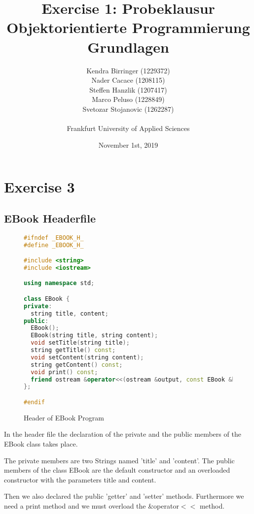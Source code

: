 \documentclass[a4paper, 10pt]{article}
\title{Exercise 1: Probeklausur Objektorientierte Programmierung Grundlagen}
\author{
    Kendra Birringer (1229372)\\
    Nader Cacace (1208115)\\
    Steffen Hanzlik (1207417)\\
    Marco Peluso (1228849)\\
    Svetozar Stojanovic (1262287)\\
    \\
    Frankfurt University of Applied Sciences
}
\date{November 1st, 2019}
\begin{document}
\maketitle

\newpage
\tableofcontents
\listoffigures

\newpage
\section{Exercise 3}
\subsection{EBook Headerfile}
\begin{figure}[ht]
\begin{lstlisting}[language=c++]
#ifndef _EBOOK_H_
#define _EBOOK_H_

#include <string>
#include <iostream>

using namespace std;

class EBook {
private:
  string title, content;
public:
  EBook();
  EBook(string title, string content);
  void setTitle(string title);
  string getTitle() const;
  void setContent(string content);
  string getContent() const;
  void print() const;
  friend ostream &operator<<(ostream &output, const EBook &book);
};

#endif
\end{lstlisting}
\caption{Header of EBook Program}
\end{figure}
In the header file the declaration of the private and the public members of the EBook class takes place.

The private members are two Strings named 'title' and 'content'.
The public members of the class EBook are the default constructor and an overloaded constructor with the parameters title and content.

Then we also declared the public 'getter' and 'setter' methods. Furthermore we need a print method and we must overload the \&operator$<<$ method.

\newpage
\end{document}
